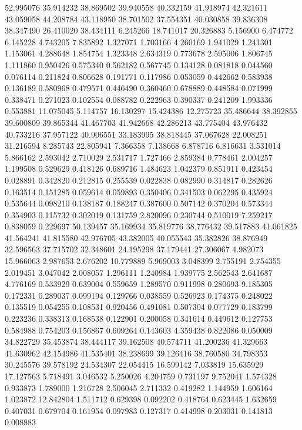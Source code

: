 52.995076
35.914232
38.869502
39.940558
40.332159
41.918974
42.321611
43.059058
44.208784
43.118950
38.701502
37.554351
40.030858
39.836308
38.347490
26.410020
38.434111
6.245266
18.741017
20.326883
5.156900
6.474772
6.145228
4.743205
7.835892
1.327071
1.703166
4.260169
1.941029
1.241301
1.153061
4.288648
1.854754
1.323348
2.634319
0.773678
2.595006
1.806745
1.111860
0.950426
0.575340
0.562182
0.567745
0.134128
0.081818
0.044560
0.076114
0.211824
0.806628
0.191771
0.117986
0.053059
0.442662
0.583938
0.136189
0.580968
0.479571
0.446490
0.360460
0.678889
0.448584
0.071999
0.338471
0.271023
0.102554
0.088782
0.222963
0.390337
0.241209
1.993336
0.553881
11.075045
5.114757
16.130297
15.424386
12.275723
35.486644
38.392855
39.600809
39.865344
41.467703
41.942668
42.286213
43.775404
43.976432
40.733216
37.957122
40.906551
33.183995
38.818445
37.067628
22.008251
31.216594
8.285743
22.805941
7.366358
7.138668
6.878716
6.816631
3.531014
5.866162
2.593042
2.710029
2.531717
1.727466
2.859384
0.778461
2.004257
1.199508
0.529629
0.418126
0.689716
1.484623
1.042379
0.851911
0.423454
0.028891
0.342820
0.212815
0.255539
0.022838
0.082990
0.314817
0.282626
0.163514
0.151285
0.059614
0.059893
0.350406
0.341503
0.062295
0.435924
0.535644
0.098210
0.138187
0.188247
0.387600
0.507142
0.370204
0.573344
0.354903
0.115732
0.302019
0.131759
2.820096
0.230744
0.510019
7.259217
0.838059
0.229697
50.139457
35.169934
35.819776
38.776432
39.517883
41.061825
41.564241
41.815580
42.976705
43.382005
40.055543
35.382826
38.876949
32.596563
37.715702
32.348601
24.195298
37.179441
27.306067
4.982073
15.966063
2.987653
2.676202
10.779889
5.969003
3.048399
2.755191
2.754355
2.019451
3.047042
2.008057
1.296111
1.240984
1.939775
2.562543
2.641687
4.776169
0.533929
0.639004
0.559659
1.289570
0.911998
0.280693
9.185305
0.172331
0.289037
0.099194
0.129766
0.038559
0.526923
0.174375
0.248022
0.135519
0.054255
0.108531
0.920456
0.491081
0.507304
0.077729
0.183799
0.223236
0.338313
0.168538
0.122901
0.200058
0.341614
0.449612
0.127753
0.584988
0.754203
0.156867
0.609264
0.143603
4.359438
0.822086
0.050009
34.822729
35.453874
38.444117
39.162508
40.574711
41.200236
41.329663
41.630962
42.154986
41.535401
38.238699
39.126416
38.760580
34.798353
30.245576
39.578192
24.534307
22.054415
16.599142
7.033819
15.635929
17.127563
5.718491
3.046532
5.250026
4.204759
0.731197
9.752041
1.574328
0.933873
1.789000
1.216728
2.506045
2.711332
0.419282
1.144959
1.606164
1.023872
12.842804
1.511712
0.629398
0.092202
0.418764
0.623445
1.632659
0.407031
0.679704
0.161954
0.097983
0.127317
0.414998
0.203031
0.141813
0.008883
